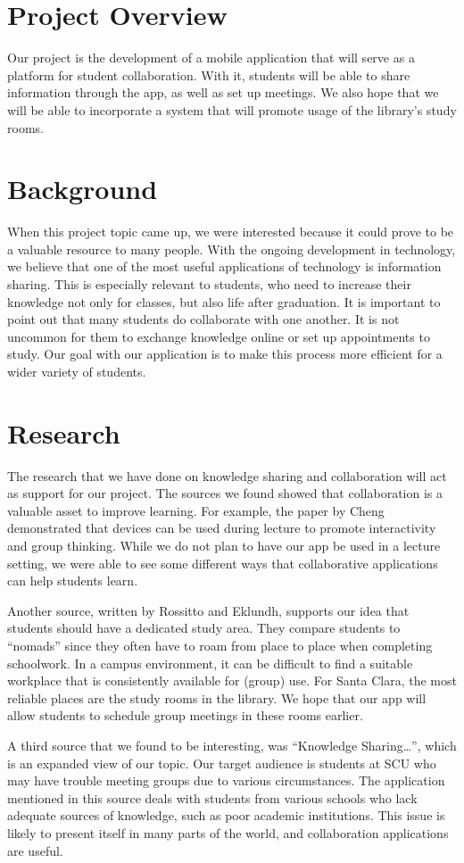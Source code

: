 \section{Project Overview}

Our project is the development of a mobile application that will serve as a platform for student collaboration. With it, students will be able to share information through the app, as well as set up meetings. We also hope that we will be able to incorporate a system that will promote usage of the library’s study rooms.

\section{Background}

When this project topic came up, we were interested because it could prove to be a valuable resource to many people. With the ongoing development in technology, we believe that one of the most useful applications of technology is information sharing. This is especially relevant to students, who need to increase their knowledge not only for classes, but also life after graduation. It is important to point out that many students do collaborate with one another. It is not uncommon for them to exchange knowledge online or set up appointments to study. Our goal with our application is to make this process more efficient for a wider variety of students.

\section{Research}

The research that we have done on knowledge sharing and collaboration will act as support for our project. The sources we found showed that collaboration is a valuable asset to improve learning. For example, the paper by Cheng demonstrated that devices can be used during lecture to promote interactivity and group thinking. While we do not plan to have our app be used in a lecture setting, we were able to see some different ways that collaborative applications can help students learn.

Another source, written by Rossitto and Eklundh, supports our idea that students should have a dedicated study area. They compare students to “nomads” since they often have to roam from place to place when completing schoolwork. In a campus environment, it can be difficult to find a suitable workplace that is consistently available for (group) use. For Santa Clara, the most reliable places are the study rooms in the library. We hope that our app will allow students to schedule group meetings in these rooms earlier.

A third source that we found to be interesting, was “Knowledge Sharing…”, which is an expanded view of our topic. Our target audience is students at SCU who may have trouble meeting groups due to various circumstances. The application mentioned in this source deals with students from various schools who lack adequate sources of knowledge, such as poor academic institutions. This issue is likely to present itself in many parts of the world, and collaboration applications are useful.